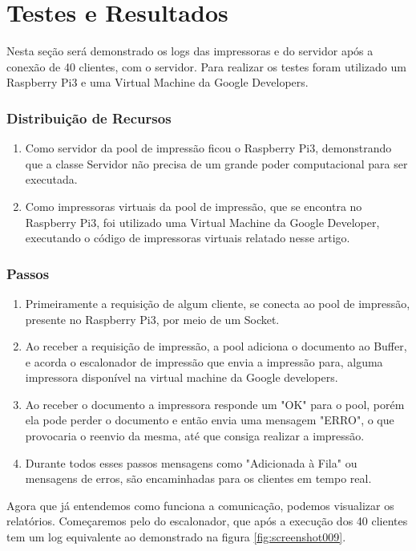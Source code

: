 \documentclass[12pt]{article}
\begin{document}
 
 \section{Testes e Resultados }
 Nesta seção será demonstrado os logs das impressoras e do servidor após a conexão de 40 clientes, com o servidor.
 Para realizar os testes foram utilizado um Raspberry Pi3 e uma Virtual Machine da Google Developers.
 \subsubsection{Distribuição de Recursos}
 \begin{enumerate}
 	
 	\item Como servidor da pool de impressão ficou o Raspberry Pi3, demonstrando que a classe Servidor não precisa de um grande poder computacional para ser executada.
 	\item Como impressoras virtuais da pool de impressão, que se encontra no Raspberry Pi3, foi utilizado uma Virtual Machine da Google Developer, executando o código de impressoras virtuais relatado nesse artigo.
 \end{enumerate}

 \subsubsection{Passos}
 \begin{enumerate}

\item Primeiramente a requisição de algum cliente, se conecta ao pool de impressão, presente no Raspberry Pi3, por meio de um Socket.

\item Ao receber a requisição de impressão, a pool adiciona o documento ao Buffer, e acorda o escalonador de impressão que envia a impressão para, alguma impressora disponível na virtual machine da Google developers.

\item Ao receber o documento a impressora responde um "OK" para o pool, porém ela pode perder o documento e então envia uma mensagem "ERRO", o que provocaria o reenvio da mesma, até que consiga realizar a impressão.

\item Durante todos esses passos mensagens como "Adicionada à Fila" ou mensagens de erros, são encaminhadas para os clientes em tempo real.

\end{enumerate}
Agora que já entendemos como funciona a comunicação, podemos visualizar os relatórios. Começaremos pelo do escalonador, que após a execução dos 40 clientes tem um log equivalente ao demonstrado na figura \ref{fig:screenshot009}.
\end{document}
